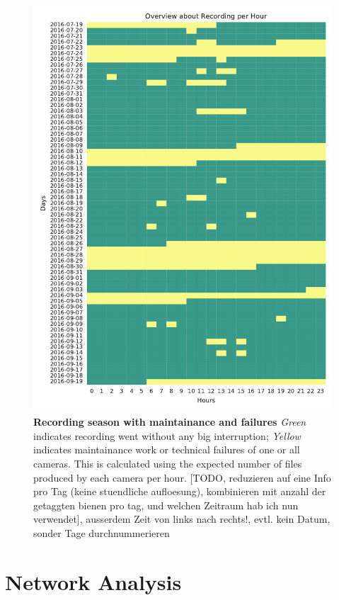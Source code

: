 \begin{figure}[htb]
	\centering
	\includegraphics[width=1.0\textwidth]{Figures/recording}
	\caption[Recording season with maintainance and failures]{\textbf{Recording season with maintainance and failures} \emph{Green} indicates recording went without any big interruption; \emph{Yellow} indicates maintainance work or technical failures of one or all cameras. This is calculated using the expected number of files produced by each camera per hour. [TODO, reduzieren auf eine Info pro Tag (keine stuendliche aufloesung), kombinieren mit anzahl der getaggten bienen pro tag, und welchen Zeitraum hab ich nun verwendet], ausserdem Zeit von links nach rechts!, evtl. kein Datum, sonder Tage durchnummerieren}
	\label{fig:observation-period}
\end{figure}



\section{Network Analysis}
\label{app-analysis}

